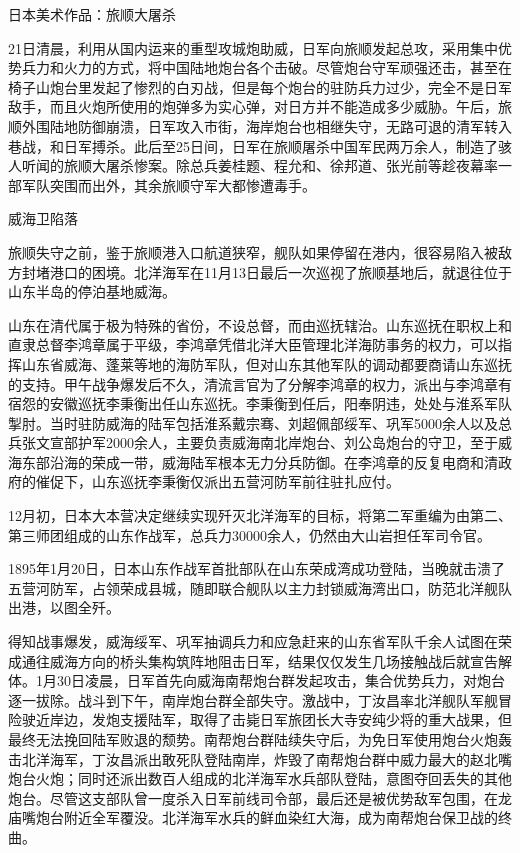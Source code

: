 \documentclass[12pt,UTF8]{ctexbook}
\begin{document}
日本美术作品：旅顺大屠杀

21日清晨，利用从国内运来的重型攻城炮助威，日军向旅顺发起总攻，采用集中优势兵力和火力的方式，将中国陆地炮台各个击破。尽管炮台守军顽强还击，甚至在椅子山炮台里发起了惨烈的白刃战，但是每个炮台的驻防兵力过少，完全不是日军敌手，而且火炮所使用的炮弹多为实心弹，对日方并不能造成多少威胁。午后，旅顺外围陆地防御崩溃，日军攻入市街，海岸炮台也相继失守，无路可退的清军转入巷战，和日军搏杀。此后至25日间，日军在旅顺屠杀中国军民两万余人，制造了骇人听闻的旅顺大屠杀惨案。除总兵姜桂题、程允和、徐邦道、张光前等趁夜幕率一部军队突围而出外，其余旅顺守军大都惨遭毒手。

威海卫陷落

旅顺失守之前，鉴于旅顺港入口航道狭窄，舰队如果停留在港内，很容易陷入被敌方封堵港口的困境。北洋海军在11月13日最后一次巡视了旅顺基地后，就退往位于山东半岛的停泊基地威海。

山东在清代属于极为特殊的省份，不设总督，而由巡抚辖治。山东巡抚在职权上和直隶总督李鸿章属于平级，李鸿章凭借北洋大臣管理北洋海防事务的权力，可以指挥山东省威海、蓬莱等地的海防军队，但对山东其他军队的调动都要商请山东巡抚的支持。甲午战争爆发后不久，清流言官为了分解李鸿章的权力，派出与李鸿章有宿怨的安徽巡抚李秉衡出任山东巡抚。李秉衡到任后，阳奉阴违，处处与淮系军队掣肘。当时驻防威海的陆军包括淮系戴宗骞、刘超佩部绥军、巩军5000余人以及总兵张文宣部护军2000余人，主要负责威海南北岸炮台、刘公岛炮台的守卫，至于威海东部沿海的荣成一带，威海陆军根本无力分兵防御。在李鸿章的反复电商和清政府的催促下，山东巡抚李秉衡仅派出五营河防军前往驻扎应付。

12月初，日本大本营决定继续实现歼灭北洋海军的目标，将第二军重编为由第二、第三师团组成的山东作战军，总兵力30000余人，仍然由大山岩担任军司令官。

1895年1月20日，日本山东作战军首批部队在山东荣成湾成功登陆，当晚就击溃了五营河防军，占领荣成县城，随即联合舰队以主力封锁威海湾出口，防范北洋舰队出港，以图全歼。

得知战事爆发，威海绥军、巩军抽调兵力和应急赶来的山东省军队千余人试图在荣成通往威海方向的桥头集构筑阵地阻击日军，结果仅仅发生几场接触战后就宣告解体。1月30日凌晨，日军首先向威海南帮炮台群发起攻击，集合优势兵力，对炮台逐一拔除。战斗到下午，南岸炮台群全部失守。激战中，丁汝昌率北洋舰队军舰冒险驶近岸边，发炮支援陆军，取得了击毙日军旅团长大寺安纯少将的重大战果，但最终无法挽回陆军败退的颓势。南帮炮台群陆续失守后，为免日军使用炮台火炮轰击北洋海军，丁汝昌派出敢死队登陆南岸，炸毁了南帮炮台群中威力最大的赵北嘴炮台火炮；同时还派出数百人组成的北洋海军水兵部队登陆，意图夺回丢失的其他炮台。尽管这支部队曾一度杀入日军前线司令部，最后还是被优势敌军包围，在龙庙嘴炮台附近全军覆没。北洋海军水兵的鲜血染红大海，成为南帮炮台保卫战的终曲。
\end{document}
